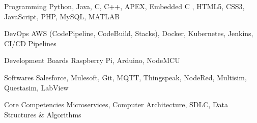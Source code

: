 

\begin{cvskills}

  \cvskill
    {Programming} %
    {Python, Java, C, C++, APEX, Embedded C , HTML5, CSS3, JavaScript, PHP, MySQL, MATLAB} %

  \cvskill
    {DevOps} %
    {AWS (CodePipeline, CodeBuild, Stacks), Docker, Kubernetes, Jenkins, CI/CD Pipelines } %

  \cvskill
    {Development Boards} %
    {Raspberry Pi, Arduino, NodeMCU} %

  \cvskill
    {Softwares} %
    {Salesforce, Mulesoft, Git, MQTT, Thingspeak, NodeRed, Multisim, Questasim, LabView} %

  \cvskill
    {Core Competencies} %
    {Microservices, Computer Architecture, SDLC, Data Structures \& Algorithms} %

\end{cvskills}
